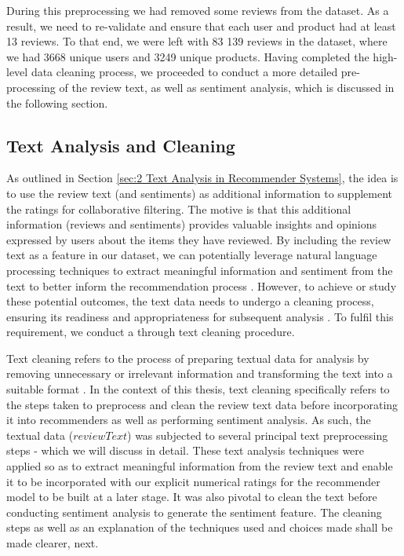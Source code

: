 During this preprocessing we had removed some reviews from the dataset. As a result, we need to re-validate and ensure that each user and product had at least 13 reviews. To that end, we were left with 83 139 reviews in the dataset, where we had 3668 unique users and 3249 unique products. Having completed the high-level data cleaning process, we proceeded to conduct a more detailed pre-processing of the review text, as well as sentiment analysis, which is discussed in the following section.

\subsection{Text Analysis and Cleaning}
\label{subsec:3 Text Analysis and Cleaning}

As outlined in Section \ref{sec:2 Text Analysis in Recommender Systems}, the idea is to use the review text (and sentiments) as additional information to supplement the ratings for collaborative filtering. The motive is that this additional information (reviews and sentiments) provides valuable insights and opinions expressed by users about the items they have reviewed. By including the review text as a feature in our dataset, we can potentially leverage natural language processing techniques to extract meaningful information and sentiment from the text to better inform the recommendation process \cite{leino2007case}. However, to achieve or study these potential outcomes, the text data needs to undergo a cleaning process, ensuring its readiness and appropriateness for subsequent  analysis \cite{chen2015augmenting}. To fulfil this requirement, we conduct a through text cleaning procedure. 

Text cleaning refers to the process of preparing textual data for analysis by removing unnecessary or irrelevant information and transforming the text into a suitable format \cite{gharatkar2017review}. In the context of this thesis, text cleaning specifically refers to the steps taken to preprocess and clean the review text data before incorporating it into recommenders as well as performing sentiment analysis. As such, the textual data ($reviewText$) was subjected to several principal text preprocessing steps - which we will discuss in detail. These text analysis techniques were applied so as to extract meaningful information from the review text and enable it to be incorporated with our explicit numerical ratings for the recommender model to be built at a later stage. It was also pivotal to clean the text before conducting sentiment analysis to generate the sentiment feature. The cleaning steps as well as an explanation of the techniques used and choices made shall be made clearer, next.


